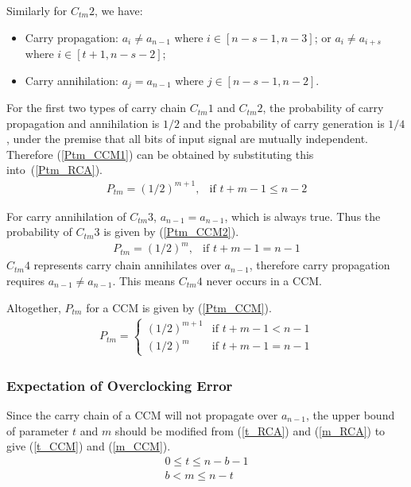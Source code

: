 \documentclass[prodmode,acmtrets]{acmsmall} %
\begin{document}
Similarly for $C_{tm}2$, we have:

\begin{itemize}
  \item Carry propagation: $a_i\neq a_{n-1}$ where $i\in[n-s-1,n-3]$; or $a_i\neq a_{i+s}$ where $i\in[t+1,n-s-2]$;
  \item Carry annihilation: $a_j=a_{n-1}$ where $j\in[n-s-1,n-2]$.
\end{itemize}

For the first two types of carry chain $C_{tm}1$ and $C_{tm}2$, the probability of carry propagation and annihilation is $1/2$ and the probability of carry generation is $1/4$, under the premise that all bits of input signal are mutually independent. Therefore (\ref{Ptm_CCM1}) can be obtained by substituting this into~(\ref{Ptm_RCA}).
%
\begin{eqnarray}\label{Ptm_CCM1}
  P_{tm}=\left(1/2\right)^{m+1}, & \textrm{if $t+m-1\leqslant n-2$}
\end{eqnarray}

For carry annihilation of $C_{tm}3$, $a_{n-1}=a_{n-1}$, which is always true. Thus the probability of $C_{tm}3$ is given by (\ref{Ptm_CCM2}).
%
\begin{eqnarray}\label{Ptm_CCM2}
  P_{tm}=\left(1/2\right)^m, & \textrm{if $t+m-1=n-1$}
\end{eqnarray}
$C_{tm}4$ represents carry chain annihilates over $a_{n-1}$, therefore carry propagation requires $a_{n-1}\neq a_{n-1}$. This means $C_{tm}4$ never occurs in a CCM.

Altogether, $P_{tm}$ for a CCM is given by (\ref{Ptm_CCM}).
\begin{eqnarray}\label{Ptm_CCM}
  P_{tm}=\left\{\begin{array}{ll}
      (1/2)^{m+1} & \textrm{if $t+m-1<n-1$}\\
      (1/2)^{m} & \textrm{if $t+m-1=n-1$}
    \end{array} \right.
\end{eqnarray}

\subsubsection{Expectation of Overclocking Error}
Since the carry chain of a CCM will not propagate over $a_{n-1}$, the upper bound of parameter $t$ and $m$ should be modified from (\ref{t_RCA}) and (\ref{m_RCA}) to give (\ref{t_CCM}) and (\ref{m_CCM}).
%
\begin{eqnarray}
  \label{t_CCM} 0\leqslant t\leqslant n-b-1\\
  \label{m_CCM} b<m\leqslant n-t
\end{eqnarray}
\end{document}
